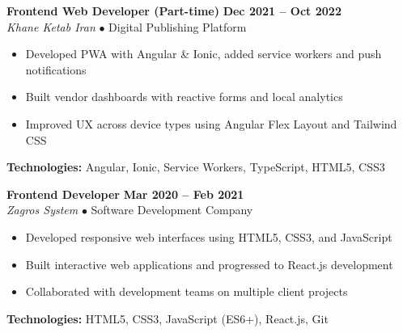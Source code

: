\documentclass[a4paper,10pt]{article}
\newcommand{\jobtitle}[1]{\textbf{#1}}
\newcommand{\company}[1]{\textit{\color{headercolor}#1}}
\begin{document}
\vspace{2pt}
\jobtitle{Frontend Web Developer (Part-time)} \hfill \textbf{Dec 2021 -- Oct 2022} \\
\company{Khane Ketab Iran} $\bullet$ Digital Publishing Platform \\
\vspace{-3pt}
\begin{itemize}[leftmargin=15pt, itemsep=0.5pt, parsep=0pt, topsep=2pt]
    \item Developed PWA with Angular \& Ionic, added service workers and push notifications
    \item Built vendor dashboards with reactive forms and local analytics
    \item Improved UX across device types using Angular Flex Layout and Tailwind CSS
\end{itemize}
\vspace{1pt}
\textbf{Technologies:} Angular, Ionic, Service Workers, TypeScript, HTML5, CSS3

\vspace{2pt}
\jobtitle{Frontend Developer} \hfill \textbf{Mar 2020 -- Feb 2021} \\
\company{Zagros System} $\bullet$ Software Development Company \\
\vspace{-3pt}
\begin{itemize}[leftmargin=15pt, itemsep=0.5pt, parsep=0pt, topsep=2pt]
    \item Developed responsive web interfaces using HTML5, CSS3, and JavaScript
    \item Built interactive web applications and progressed to React.js development
    \item Collaborated with development teams on multiple client projects
\end{itemize}
\vspace{1pt}
\textbf{Technologies:} HTML5, CSS3, JavaScript (ES6+), React.js, Git
\end{document}
